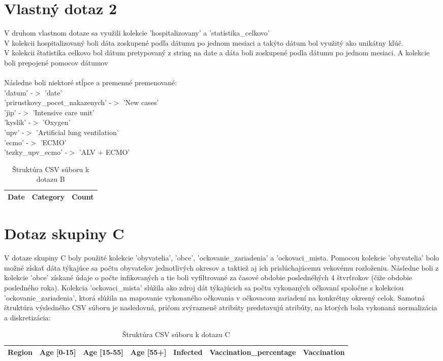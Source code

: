 \documentclass[a4paper, 16pt]{article}
\begin{document}
\section{Vlastný dotaz 2}
V druhom vlastnom dotaze sa využili kolekcie 'hospitalizovany' a 'statistika\_celkovo'\\
V kolekcii hospitalizovaný boli dáta zoskupené podľa dátumu po jednom mesiaci a takýto dátum bol využitý ako unikátny kľúč.\\
V kolekcii štatistika celkovo bol dátum pretypovaný z string na date a dáta boli zoskupené podla dátumu po jednom mesiaci. A kolekcie boli prepojené pomocov dátumov\\\\
Následne boli niektoré stĺpce a premenné premenované:\\
'datum' -$>$ 'date'\\
'prirustkovy\_pocet\_nakazenych' -$>$ 'New cases'\\
'jip' -$>$ 'Intensive care unit'\\
'kyslik' -$>$ 'Oxygen'\\
'upv' -$>$ 'Artificial lung ventilation'\\
'ecmo' -$>$ 'ECMO'\\
'tezky\_upv\_ecmo' -$>$ 'ALV + ECMO'\\

\begin{table}[H]\centering
\begin{tabular}{|l|l|l|}
\hline
\textbf{Date} & Category & Count \\ \hline
\end{tabular}
\caption{Štruktúra CSV súboru k dotazu B}
\end{table}

\section{Dotaz skupiny C}
V dotaze skupiny C boly použité kolekcie 'obyvatelia', 'obce', 'ockovanie\_zariadenia' a 'ockovaci\_mista. Pomocou kolekcie 'obyvatelia' bolo možné získať dáta týkajúce sa počtu obyvateľov jednotlivých okresov a taktiež aj ich prislúchajúcemu vekovému rozloženiu. Následne boli z kolekcie 'obce' získané údaje o počte infikovaných a tie boli vyfiltrované za časové obdobie poslednéhých 4 štvrťrokov (čiže obdobie posledného roka). Kolekcia 'ockovaci\_mista' slúžila ako zdroj dát týkajúcich sa počtu vykonaných očkovaní spoločne s kolekciou 'ockovanie\_zariadenia', ktorá slúžila na mapovanie vykonaného očkovania v očkovacom zariadení na konkrétny okresný celok. Samotná štruktúra výsledného CSV súboru je nasledovná, pričom zvýraznené atribúty predstavujú atribúty, na ktorých bola vykonaná normalizácia a diskretizácia:

\begin{center}
\begin{table}[H]
\label{tab_c1}
\begin{tabular}{|l|l|l|l|l|l|l|}
\hline
Region & Age [0-15] & Age [15-55] & Age [55+] & Infected & \textbf{Vaccination\_percentage} & \textbf{Vaccination}\\
\hline
\end{tabular}
\caption{Štruktúra CSV súboru k dotazu C}
\end{table}
\end{center}

	
\end{document}
